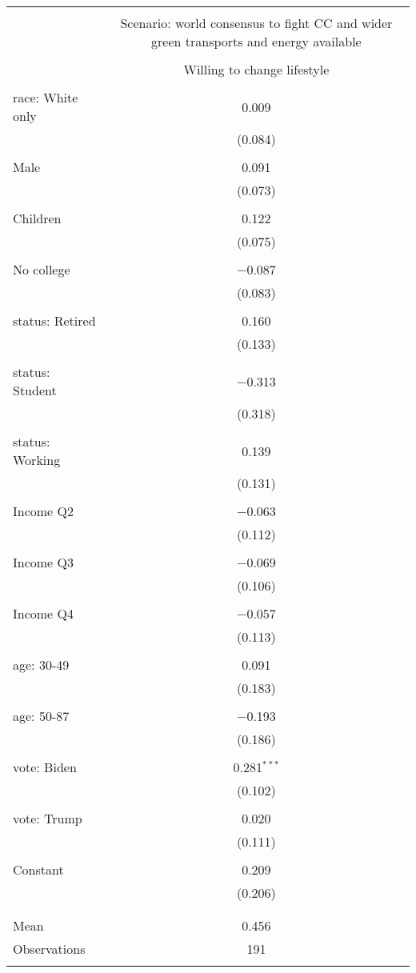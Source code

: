 
\begin{tabular}{@{\extracolsep{5pt}}lc} 
\\[-1.8ex]\hline 
\hline \\[-1.8ex] 
 & \multicolumn{1}{c}{Scenario: world consensus to fight CC and wider green transports and energy available} \\ 
\cline{2-2} 
\\[-1.8ex] & Willing to change lifestyle \\ 
\hline \\[-1.8ex] 
 race: White only & 0.009 \\ 
  & (0.084) \\ 
  & \\ 
 Male & 0.091 \\ 
  & (0.073) \\ 
  & \\ 
 Children & 0.122 \\ 
  & (0.075) \\ 
  & \\ 
 No college & $-$0.087 \\ 
  & (0.083) \\ 
  & \\ 
 status: Retired & 0.160 \\ 
  & (0.133) \\ 
  & \\ 
 status: Student & $-$0.313 \\ 
  & (0.318) \\ 
  & \\ 
 status: Working & 0.139 \\ 
  & (0.131) \\ 
  & \\ 
 Income Q2 & $-$0.063 \\ 
  & (0.112) \\ 
  & \\ 
 Income Q3 & $-$0.069 \\ 
  & (0.106) \\ 
  & \\ 
 Income Q4 & $-$0.057 \\ 
  & (0.113) \\ 
  & \\ 
 age: 30-49 & 0.091 \\ 
  & (0.183) \\ 
  & \\ 
 age: 50-87 & $-$0.193 \\ 
  & (0.186) \\ 
  & \\ 
 vote: Biden & 0.281$^{***}$ \\ 
  & (0.102) \\ 
  & \\ 
 vote: Trump & 0.020 \\ 
  & (0.111) \\ 
  & \\ 
 Constant & 0.209 \\ 
  & (0.206) \\ 
  & \\ 
\hline \\[-1.8ex] 
Mean & 0.456 \\ 
Observations & 191 \\ 
\hline 
\hline \\[-1.8ex] 
\end{tabular} 
